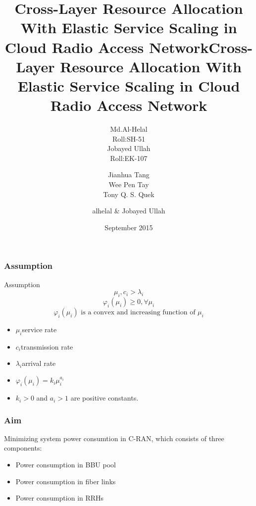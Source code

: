 \documentclass[usenames,dvipsnames]{beamer}
\begin{document}
  \title{Cross-Layer  Resource  Allocation With  Elastic Service Scaling in Cloud Radio Access Network}
  \author[alhelal \& Jobayed Ullah]{
  \parbox{2.5cm}{
\centering Md.Al-Helal\\Roll:SH-51}\hspace{1cm}
\parbox{2.5cm}{
{\centering Jobayed Ullah\\Roll:EK-107}}
}
\begin{frame}
  \maketitle
\end{frame}
  \title{Cross-Layer  Resource  Allocation With  Elastic Service Scaling in Cloud Radio Access Network}
  \author{Jianhua Tang\\ Wee Pen Tay\\ Tony Q. S. Quek}
\date{September 2015}
\begin{frame}
  \maketitle
\end{frame}
  \author{alhelal \& Jobayed Ullah}
\begin{frame}
  \frametitle{Assumption}
  \begin{exampleblock}{Assumption}
    \[
      \mu_{i},c_{i} > \lambda_{i}
    \]
    \[
      \varphi_{i}(\mu_{i})\geq 0, \forall \mu_{i}
    \]
    \[
      \varphi_{i}(\mu_{i}) \text{ is a convex and increasing function of } \mu_{i}
    \]
  \end{exampleblock}
  \begin{itemize}
    \item $\mu_{i}$\quad service rate
    \item $c_{i}$\quad transmission rate
    \item $\lambda_{i}$\quad arrival rate
    \item $\varphi_{i}{(\mu_{i})} = k_{i}\mu_{i}^{a_{i}}$
    \item $k_{i} > 0$ and $a_{i} > 1$ are positive constants.
  \end{itemize}
\end{frame}
\begin{frame}
  \frametitle{Aim}
  Minimizing system power consumtion in C-RAN, which consists of three components:
  \begin{itemize}
  \item Power consumption in BBU pool
  \item Power consumption in fiber links
  \item Power consumption in RRHs
  \end{itemize}
\end{frame}
\end{document}
